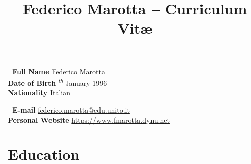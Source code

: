 \documentclass[10pt]{article} %
\begin{document}

\title{Federico Marotta -- Curriculum Vit\ae}


\parbox{0.5\textwidth}{ %
\begin{tabbing} %
\hspace{3cm} \= \hspace{4cm} \= \kill %
{\bf Full Name} \> Federico Marotta \\
{\bf Date of Birth} \textsuperscript{\textit{th}} January 1996 \\ %
{\bf Nationality} \> Italian %
\end{tabbing}}
\hfill %
\parbox{0.5\textwidth}{ %
\begin{tabbing} %
\hspace{3cm} \= \hspace{4cm} \= \kill %
{\bf E-mail} \> \href{mailto:federico.marotta@edu.unito.it}{federico.marotta@edu.unito.it} \\
{\bf Personal Website} \> \href{https://www.fmarotta.dynu.net}{https://www.fmarotta.dynu.net} \\
\end{tabbing}}



\section{Education}

\end{document}
